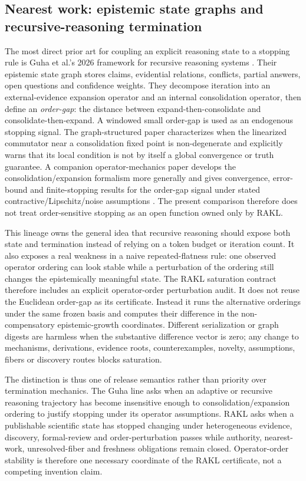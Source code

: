 \documentclass[11pt]{article}
\begin{document}
\subsection{Nearest work: epistemic state graphs and recursive-reasoning termination}

The most direct prior art for coupling an explicit reasoning state to a stopping rule is Guha et al.'s 2026 framework for recursive reasoning systems \cite{guha2026termination}. Their epistemic state graph stores claims, evidential relations, conflicts, partial answers, open questions and confidence weights. They decompose iteration into an external-evidence expansion operator and an internal consolidation operator, then define an \emph{order-gap}: the distance between expand-then-consolidate and consolidate-then-expand. A windowed small order-gap is used as an endogenous stopping signal. The graph-structured paper characterizes when the linearized commutator near a consolidation fixed point is non-degenerate and explicitly warns that its local condition is not by itself a global convergence or truth guarantee. A companion operator-mechanics paper develops the consolidation/expansion formalism more generally and gives convergence, error-bound and finite-stopping results for the order-gap signal under stated contractive/Lipschitz/noise assumptions \cite{guha2026opmech}. The present comparison therefore does not treat order-sensitive stopping as an open function owned only by RAKL.

This lineage owns the general idea that recursive reasoning should expose both state and termination instead of relying on a token budget or iteration count. It also exposes a real weakness in a naive repeated-flatness rule: one observed operator ordering can look stable while a perturbation of the ordering still changes the epistemically meaningful state. The RAKL saturation contract therefore includes an explicit operator-order perturbation audit. It does not reuse the Euclidean order-gap as its certificate. Instead it runs the alternative orderings under the same frozen basis and computes their difference in the non-compensatory epistemic-growth coordinates. Different serialization or graph digests are harmless when the substantive difference vector is zero; any change to mechanisms, derivations, evidence roots, counterexamples, novelty, assumptions, fibers or discovery routes blocks saturation.

The distinction is thus one of release semantics rather than priority over termination mechanics. The Guha line asks when an adaptive or recursive reasoning trajectory has become insensitive enough to consolidation/expansion ordering to justify stopping under its operator assumptions. RAKL asks when a publishable scientific state has stopped changing under heterogeneous evidence, discovery, formal-review and order-perturbation passes while authority, nearest-work, unresolved-fiber and freshness obligations remain closed. Operator-order stability is therefore one necessary coordinate of the RAKL certificate, not a competing invention claim.
\end{document}
